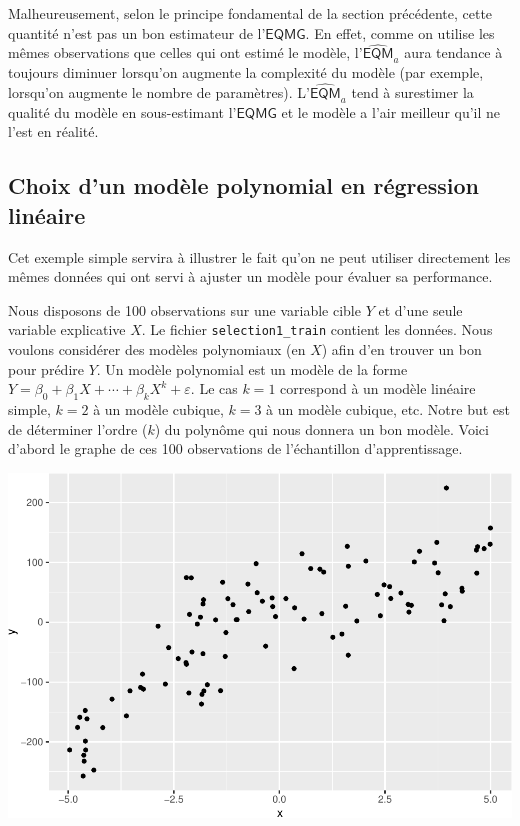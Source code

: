 \documentclass[
  11pt,
  letterpaper,
]{book}
\theoremstyle{definition}
\theoremstyle{definition}
\theoremstyle{definition}
\theoremstyle{definition}
\theoremstyle{remark}
\begin{document}
Malheureusement, selon le principe fondamental de la section précédente, cette quantité n'est pas un bon estimateur de l'\(\mathsf{EQMG}\). En effet, comme on utilise les mêmes observations que celles qui ont estimé le modèle, l'\(\widehat{\mathsf{EQM}}_a\) aura tendance à toujours diminuer lorsqu'on augmente la complexité du modèle (par exemple, lorsqu'on augmente le nombre de paramètres). L'\(\widehat{\mathsf{EQM}}_a\) tend à surestimer la qualité du modèle en sous-estimant l'\(\mathsf{EQMG}\) et le modèle a l'air meilleur qu'il ne l'est en réalité.

\hypertarget{choix-dun-moduxe8le-polynomial-en-ruxe9gression-linuxe9aire}{%
\subsection{Choix d'un modèle polynomial en régression linéaire}\label{choix-dun-moduxe8le-polynomial-en-ruxe9gression-linuxe9aire}}

Cet exemple simple servira à illustrer le fait qu'on ne peut utiliser directement les mêmes données qui ont servi à ajuster un modèle pour évaluer sa performance.

Nous disposons de 100 observations sur une variable cible \(Y\) et d'une seule variable explicative \(X\). Le fichier \texttt{selection1\_train} contient les données. Nous voulons considérer des modèles polynomiaux (en \(X\)) afin d'en trouver un bon pour prédire \(Y\). Un modèle polynomial est un modèle de la forme \(Y=\beta_0 + \beta_1X+\cdots+\beta_kX^k+\varepsilon\). Le cas \(k=1\) correspond à un modèle linéaire simple, \(k=2\) à un modèle cubique, \(k=3\) à un modèle cubique, etc. Notre but est de déterminer l'ordre (\(k\)) du polynôme qui nous donnera un bon modèle. Voici d'abord le graphe de ces 100 observations de l'échantillon d'apprentissage.

\begin{center}\includegraphics[width=0.7\linewidth]{MATH60602_files/figure-latex/02-graphedonneestest-1} \end{center}
\end{document}
